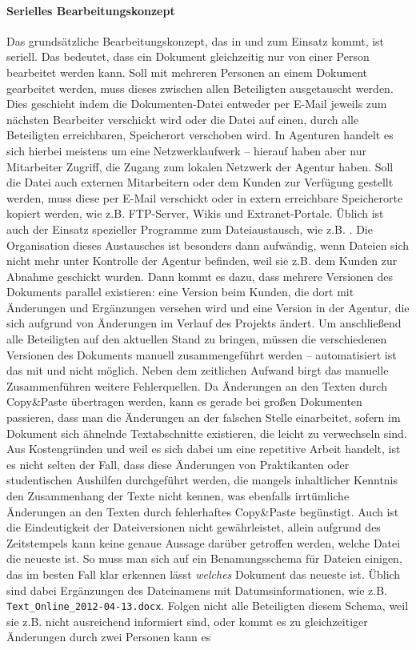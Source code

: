 \bigskip

\label{p:serielles-konzept}\paragraph{Serielles Bearbeitungskonzept} Das grundsätzliche Bearbeitungskonzept, das in  und  zum Einsatz kommt, ist seriell. Das bedeutet, dass ein Dokument gleichzeitig nur von einer Person bearbeitet werden kann. Soll mit mehreren Personen an einem Dokument gearbeitet werden, muss dieses zwischen allen Beteiligten ausgetauscht werden. Dies geschieht indem die Dokumenten-Datei entweder per E-Mail jeweils zum nächsten Bearbeiter verschickt wird oder die Datei auf einen, durch alle Beteiligten erreichbaren, Speicherort verschoben wird. In Agenturen handelt es sich hierbei meistens um eine Netzwerklaufwerk -- hierauf haben aber nur Mitarbeiter Zugriff, die Zugang zum lokalen Netzwerk der Agentur haben. Soll die Datei auch externen Mitarbeitern oder dem Kunden zur Verfügung gestellt werden, muss diese per E-Mail verschickt oder in extern erreichbare Speicherorte kopiert werden, wie z.B. FTP-Server, Wikis und Extranet-Portale. Üblich ist auch der Einsatz spezieller Programme zum Dateiaustausch, wie z.B. . Die Organisation dieses Austausches ist besonders dann aufwändig, wenn Dateien sich nicht mehr unter Kontrolle der Agentur befinden, weil sie z.B. dem Kunden zur Abnahme geschickt wurden. Dann kommt es dazu, dass mehrere Versionen des Dokuments parallel existieren: eine Version beim Kunden, die dort mit Änderungen und Ergänzungen versehen wird und eine Version in der Agentur, die sich aufgrund von Änderungen im Verlauf des Projekts ändert. Um anschließend alle Beteiligten auf den aktuellen Stand zu bringen, müssen die verschiedenen Versionen des Dokuments manuell zusammengeführt werden -- automatisiert ist das mit  und  nicht möglich. Neben dem zeitlichen Aufwand birgt das manuelle Zusammenführen weitere Fehlerquellen. Da Änderungen an den Texten durch Copy\&Paste übertragen werden, kann es gerade bei großen Dokumenten passieren, dass man die Änderungen an der falschen Stelle einarbeitet, sofern im Dokument sich ähnelnde Textabschnitte existieren, die leicht zu verwechseln sind. Aus Kostengründen und weil es sich dabei um eine repetitive Arbeit handelt, ist es nicht selten der Fall, dass diese Änderungen von Praktikanten oder studentischen Aushilfen durchgeführt werden, die mangels inhaltlicher Kenntnis den Zusammenhang der Texte nicht kennen, was ebenfalls irrtümliche Änderungen an den Texten durch fehlerhaftes Copy\&Paste begünstigt. Auch ist die Eindeutigkeit der Dateiversionen nicht gewährleistet, allein aufgrund des Zeitstempels kann keine genaue Aussage darüber getroffen werden, welche Datei die neueste ist. So muss man sich auf ein Benamungsschema für Dateien einigen, das im besten Fall klar erkennen lässt \emph{welches} Dokument das neueste ist. Üblich sind dabei Ergänzungen des Dateinamens mit Datumsinformationen, wie z.B. \texttt{Text\_Online\_2012-04-13.docx}. Folgen nicht alle Beteiligten diesem Schema, weil sie z.B. nicht ausreichend informiert sind, oder kommt es zu gleichzeitiger Änderungen durch zwei Personen kann es 